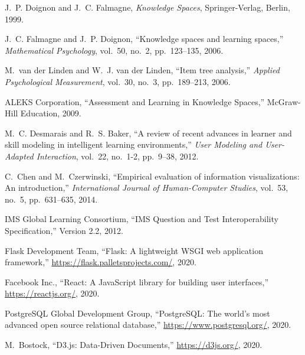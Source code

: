 \documentclass[conference]{IEEEtran}
\begin{document}
\begin{thebibliography}{1}

J.~P. Doignon and J.~C. Falmagne,
\newblock \emph{Knowledge Spaces},
\newblock Springer-Verlag, Berlin, 1999.

J.~C. Falmagne and J.~P. Doignon,
\newblock ``Knowledge spaces and learning spaces,''
\newblock \emph{Mathematical Psychology}, vol.~50, no.~2, pp.~123--135, 2006.

M.~van der Linden and W.~J. van der Linden,
\newblock ``Item tree analysis,''
\newblock \emph{Applied Psychological Measurement}, vol.~30, no.~3, pp.~189--213, 2006.

ALEKS Corporation,
\newblock ``Assessment and Learning in Knowledge Spaces,''
\newblock McGraw-Hill Education, 2009.

M.~C. Desmarais and R.~S. Baker,
\newblock ``A review of recent advances in learner and skill modeling in intelligent learning environments,''
\newblock \emph{User Modeling and User-Adapted Interaction}, vol.~22, no.~1-2, pp.~9--38, 2012.

C.~Chen and M.~Czerwinski,
\newblock ``Empirical evaluation of information visualizations: An introduction,''
\newblock \emph{International Journal of Human-Computer Studies}, vol.~53, no.~5, pp.~631--635, 2014.

IMS Global Learning Consortium,
\newblock ``IMS Question and Test Interoperability Specification,''
\newblock Version 2.2, 2012.

Flask Development Team,
\newblock ``Flask: A lightweight WSGI web application framework,''
\newblock \url{https://flask.palletsprojects.com/}, 2020.

Facebook Inc.,
\newblock ``React: A JavaScript library for building user interfaces,''
\newblock \url{https://reactjs.org/}, 2020.

PostgreSQL Global Development Group,
\newblock ``PostgreSQL: The world's most advanced open source relational database,''
\newblock \url{https://www.postgresql.org/}, 2020.

M.~Bostock,
\newblock ``D3.js: Data-Driven Documents,''
\newblock \url{https://d3js.org/}, 2020.

\end{thebibliography}
\end{document}
